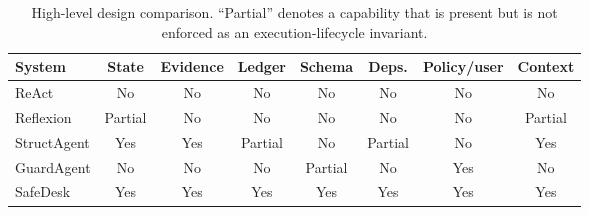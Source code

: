 \begin{table}[t]
\centering
\caption{High-level design comparison. ``Partial'' denotes a capability that is
present but is not enforced as an execution-lifecycle invariant.}
\label{tab:related-comparison}
\small
\setlength{\tabcolsep}{3.3pt}
\begin{tabular}{@{}lccccccc@{}}
\toprule
System & State & Evidence & Ledger & Schema & Deps. & Policy/user & Context \\
\midrule
ReAct & No & No & No & No & No & No & No \\
Reflexion & Partial & No & No & No & No & No & Partial \\
StructAgent & Yes & Yes & Partial & No & Partial & No & Yes \\
GuardAgent & No & No & No & Partial & No & Yes & No \\
SafeDesk & Yes & Yes & Yes & Yes & Yes & Yes & Yes \\
\bottomrule
\end{tabular}
\end{table}

